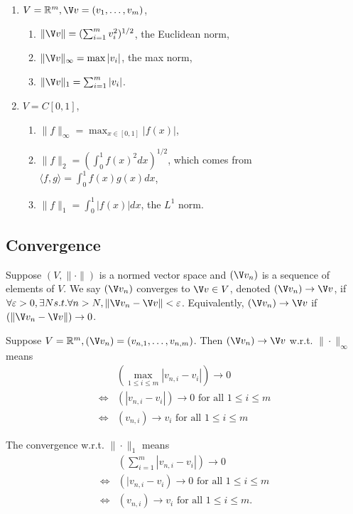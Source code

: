 \documentclass[a4paper]{article}
\theoremstyle{definition}
\begin{document}
\begin{eg}\leavevmode
  \begin{enumerate}
  \item $V= \mathbb{R}^m, \V v = (v_1,\ldots,v_m)$,
    \begin{enumerate}
    \item $\|\V v\| = (\sum_{i=1}^m v_i^2)^{1/2}$, the Euclidean norm,
    \item $\|\V v\|_\infty = \max |v_i|$, the max norm,
      \item $\|\V v\|_1 = \sum_{i=1}^m |v_i|$.
    \end{enumerate}
  \item $V=C[0,1]$,
    \begin{enumerate}
    \item $\|f\|_\infty=\max_{x\in[0,1]} |f(x)|$,
    \item $\|f\|_2=(\int_0^1 f(x)^2 dx)^{1/2}$, which comes from $\langle f,g\rangle = \int_0^1f(x)g(x) dx$,
      \item $\|f\|_1=\int_0^1|f(x)| dx$, the $L^1$ norm.
    \end{enumerate}
  \end{enumerate}
\end{eg}

\subsection{Convergence}

\begin{defi}
  Suppose $(V, \|\cdot\|)$ is a normed vector space and $(\V v_n)$ is a sequence of elements of $V$. We say $(\V v_n)$ converges to $\V v\in V$, denoted $(\V v_n)\to \V v$, if $\forall\varepsilon>0,\exists N s.t. \forall n>N, \|\V v_n-\V v\|<\varepsilon$. Equivalently, $(\V v_n)\to \V v$ if $(\|\V v_n-\V v\|)\to 0$.
\end{defi}

\begin{ex}
  Suppose $V=\mathbb{R}^m, (\V v_n) = (v_{n,1},\ldots,v_{n,m})$. Then $(\V v_n)\to \V v$ w.r.t. $\|\cdot\|_\infty$ means
  \begin{align*}
    & (\max_{1\leq i \leq m}|v_{n,i}-v_i|) \to 0 \\
    \Longleftrightarrow & (|v_{n,i}-v_i|)\to 0 \text{ for all } 1\leq i\leq m \\
    \Longleftrightarrow & (v_{n,i})\to v_i \text{ for all } 1\leq i\leq m
  \end{align*}

   The convergence w.r.t. $\|\cdot\|_1$ means
   \begin{align*}
     & (\sum_{i=1}^m |v_{n,i}-v_i|)\to 0 \\
     \Longleftrightarrow & (|v_{n,i}-v_i)\to 0 \text{ for all } 1\leq i\leq m \\ 
    \Longleftrightarrow & (v_{n,i})\to v_i \text{ for all } 1\leq i\leq m.
  \end{align*}
\end{ex}
\end{document}

